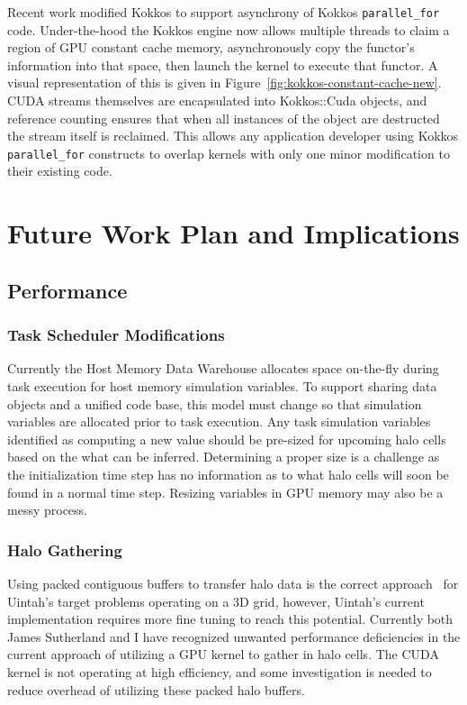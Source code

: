 \documentclass[12pt]{article}
\begin{document}
Recent work modified Kokkos to support asynchrony of Kokkos \texttt{parallel\_for} code.  Under-the-hood the Kokkos engine now allows multiple threads to claim a region of GPU constant cache memory, asynchronously copy the functor's information into that space, then launch the kernel to execute that functor.  A visual representation of this is given in Figure~\ref{fig:kokkos-constant-cache-new}.  CUDA streams themselves are encapsulated into Kokkos::Cuda objects, and reference counting ensures that when all instances of the object are destructed the stream itself is reclaimed.  This allows any application developer using Kokkos \texttt{parallel\_for} constructs to overlap kernels with only one minor modification to their existing code. 




\section{Future Work Plan and Implications}
\label{ch:workplan}

\subsection{Performance}
\label{ch:workplan-performance}
\subsubsection{Task Scheduler Modifications}
\label{ch:task-scheduler-modification}
Currently the Host Memory Data Warehouse allocates space on-the-fly during task execution for host memory simulation variables.  To support sharing data objects and a unified code base, this model must change so that simulation variables are allocated prior to task execution.   Any task simulation variables identified as computing a new value should be pre-sized for upcoming halo cells based on the what can be inferred.  Determining a proper size is a challenge as the initialization time step has no information as to what halo cells will soon be found in a normal time step.  Resizing variables in GPU memory may also be a messy process.  

\subsubsection{Halo Gathering}
\label{ch:workplan-halo-gathering}
Using packed contiguous buffers to transfer halo data is the correct approach~\cite{ijpp16} for Uintah's target problems operating on a 3D grid, however, Uintah's current implementation requires more fine tuning to reach this potential. Currently both James Sutherland and I have recognized unwanted performance deficiencies in the current approach of utilizing a GPU kernel to gather in halo cells.   The CUDA kernel is not operating at high efficiency, and some investigation is needed to reduce overhead of utilizing these packed halo buffers. 
\end{document}
